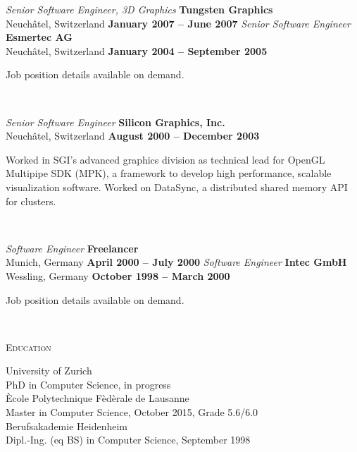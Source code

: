 \parbox[t]{2.5cm}{\hspace{1pt}}
\parbox[t]{12.5cm}{
  {\em Senior Software Engineer, 3D Graphics} \hfill {\bf Tungsten Graphics}\\
  Neuch\^atel, Switzerland  \hfill {\bf January 2007 -- June 2007}\exrule
  {\em Senior Software Engineer} \hfill {\bf Esmertec AG}\\
  Neuch\^atel, Switzerland  \hfill {\bf January 2004 -- September 2005}\exrule

  Job position details available on demand.
}\\

\parbox[t]{2.5cm}{\hspace{1pt}}
\parbox[t]{12.5cm}{
  {\em Senior Software Engineer}  \hfill {\bf Silicon Graphics, Inc.}\\
  Neuch\^atel, Switzerland \hfill {\bf August 2000 -- December 2003}\exrule

  Worked in SGI's advanced graphics division as technical lead for OpenGL
  Multipipe SDK (MPK), a framework to develop high performance, scalable
  visualization software. Worked on DataSync, a distributed shared memory API
  for clusters.  }\\

\parbox[t]{2.5cm}{\hspace{1pt}}
\parbox[t]{12.5cm}{
  {\em Software Engineer} \hfill {\bf Freelancer}\\
  Munich, Germany         \hfill {\bf April 2000 -- July 2000}\exrule
  {\em Software Engineer} \hfill {\bf Intec GmbH}\\
  Wessling, Germany       \hfill {\bf October 1998 -- March 2000}\exrule

  Job position details available on demand.
}\vspace{1em}\\

\parbox[t]{2.5cm}{\scshape Education}
\parbox[t]{12.5cm}{
  University of Zurich\\
  PhD in Computer Science, in progress
  \vspace{.3em}\\
  \`Ecole Polytechnique F\`ed\`erale de Lausanne\\
  Master in Computer Science, October 2015, Grade 5.6/6.0
  \vspace{.3em}\\
  Berufsakademie Heidenheim\\
  Dipl.-Ing. (eq BS) in Computer Science, September 1998
}\vspace{1em}\\


